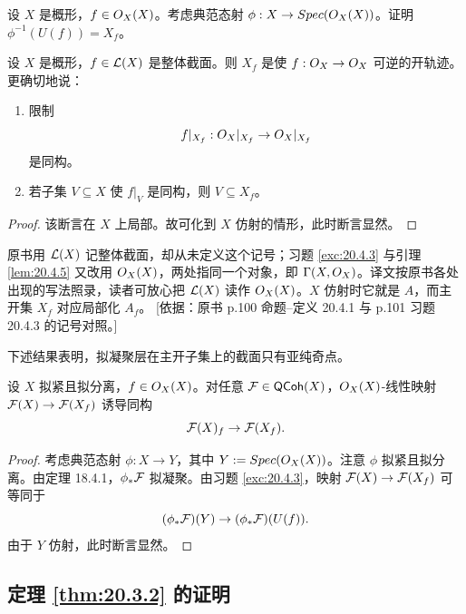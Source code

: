 \begin{exercise}\label{exc:20.4.3}
设 $X$ 是概形，$f\in O_X(X)$。考虑典范态射 $\phi:X\to Spec(O_X(X))$。证明 $\phi^{-1}(U(f))=X_f$。
\end{exercise}

\begin{lemma}\label{lem:20.4.4}
设 $X$ 是概形，$f\in\mathcal{L}(X)$ 是整体截面。则 $X_f$ 是使 $f:O_X\to O_X$ 可逆的开轨迹。更确切地说：
\begin{enumerate}[label=(\roman*),leftmargin=2em,itemsep=0.25ex]
  \item 限制
  \[
  f|_{X_f}:O_X|_{X_f}\to O_X|_{X_f}
  \]
  是同构。
  \item 若子集 $V\subseteq X$ 使 $f|_V$ 是同构，则 $V\subseteq X_f$。
\end{enumerate}
\end{lemma}

\begin{proof}
该断言在 $X$ 上局部。故可化到 $X$ 仿射的情形，此时断言显然。
\end{proof}

\begin{yizhu}
原书用 $\mathcal{L}(X)$ 记整体截面，却从未定义这个记号；习题 \ref{exc:20.4.3} 与引理 \ref{lem:20.4.5} 又改用 $O_X(X)$，两处指同一个对象，即 $\Gamma(X,O_X)$。译文按原书各处出现的写法照录，读者可放心把 $\mathcal{L}(X)$ 读作 $O_X(X)$。$X$ 仿射时它就是 $A$，而主开集 $X_f$ 对应局部化 $A_f$。
[依据：原书 p.100 命题--定义 20.4.1 与 p.101 习题 20.4.3 的记号对照。]
\end{yizhu}

下述结果表明，拟凝聚层在主开子集上的截面只有亚纯奇点。

\begin{lemma}\label{lem:20.4.5}
设 $X$ 拟紧且拟分离，$f\in O_X(X)$。对任意 $\mathcal{F}\in\mathsf{QCoh}(X)$，$O_X(X)$-线性映射 $\mathcal{F}(X)\to\mathcal{F}(X_f)$ 诱导同构
\[
\mathcal{F}(X)_f\to\mathcal{F}(X_f).
\]
\end{lemma}

\begin{proof}
考虑典范态射 $\phi:X\to Y$，其中 $Y:=Spec(O_X(X))$。注意 $\phi$ 拟紧且拟分离。由定理 18.4.1，$\phi_*\mathcal{F}$ 拟凝聚。由习题 \ref{exc:20.4.3}，映射 $\mathcal{F}(X)\to\mathcal{F}(X_f)$ 可等同于
\[
(\phi_*\mathcal{F})(Y)\to(\phi_*\mathcal{F})(U(f)).
\]
由于 $Y$ 仿射，此时断言显然。
\end{proof}

\subsection{定理 \ref{thm:20.3.2} 的证明}\label{sec:20.5}

